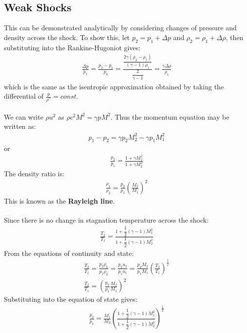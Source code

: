 \documentclass[class=report, crop=false, 12pt,a4paper]{standalone}
\begin{document}
\subsection{Weak Shocks}
This can be demonstrated analytically by considering changes of pressure and density across the shock. 
To show this, let $p_2 = p_1 + \Delta p$ and $\rho_2 = \rho_1 + \Delta \rho$, then substituting into the Rankine-Hugoniot gives: 
\begin{gather}
    \frac{\Delta p}{p_1} = \frac{p_2-p_1}{p_1} = \frac{\dfrac{2\gamma(\rho_2-\rho_1)}{(\gamma-1)\rho_1}}{\dfrac{2}{\gamma-1}} = \frac{\gamma\Delta \rho}{\rho_1}
\end{gather}
which is the same as the isentropic approximation obtained by taking the differential of $\frac{p}{\rho^\gamma} = const.$
\\\\
We can write $\rho u^2$ as $\rho c^2 M^2 = \gamma p M^2$. 
Thus the momentum equation may be written as: 
\begin{gather}
    p_1 - p_2 = \gamma p_2 M_2^2 - \gamma p_1 M_1^2
\end{gather} 
or 
\begin{gather}
    \frac{p_2}{p_1} = \frac{1+\gamma M_1^2}{1+\gamma M_2^2}
\end{gather}
The density ratio is: 
\begin{gather}
    \frac{\rho_1}{\rho_2} = \frac{p_2}{p_1} \left( \frac{M_2}{M_1} \right)^2
\end{gather}
This is known as the \textbf{Rayleigh line}. 
\\\\
Since there is no change in stagnation temperature across the shock: 
\begin{gather}
    \frac{T_2}{T_1} = \frac{1+\dfrac{1}{2}(\gamma-1)M_1^2}{1+\dfrac{1}{2}(\gamma-1)M_2^2}
\end{gather}
From the equations of continuity and state: 
\begin{gather}
    \frac{T_2}{T_1} = \frac{p_2 \rho_1}{p_1 \rho_2} = \frac{p_2 u_2}{p_1 u_1} = \frac{p_2 M_2}{p_1 M_1} \left(\frac{T_2}{T_1}\right)^{\frac{1}{2}} \\[5pt]
    \frac{T_2}{T_1} = \left( \frac{p_2}{p_1} \frac{M_2}{M_1} \right)^2
\end{gather}
Substituting into the equation of state gives: 
\begin{gather}
    \frac{p_2}{p_1} = \frac{M_1}{M_2} \left( \frac{1+\dfrac{1}{2}(\gamma-1)M_1^2}{1+\dfrac{1}{2}(\gamma-1)M_2^2} \right)^{\frac{1}{2}}
\end{gather}
\end{document}
